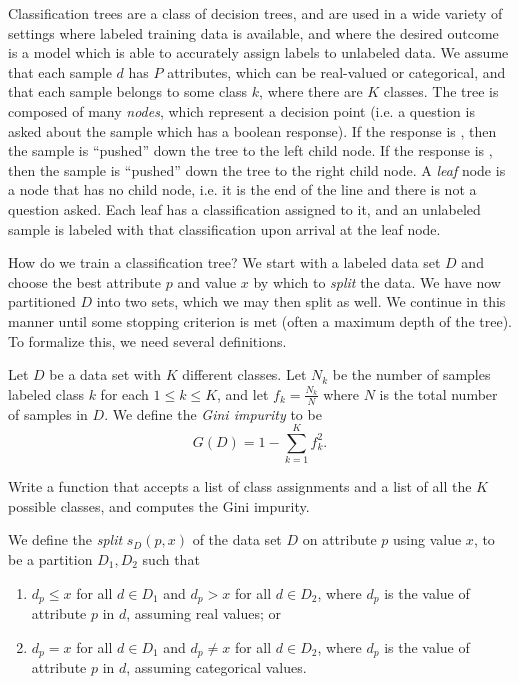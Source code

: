 
Classification trees are a class of decision trees, and are used in a wide variety of settings where labeled training data is available, and where the desired outcome is a model which is able to accurately assign labels to unlabeled data. We assume that each sample $d$ has $P$ attributes, which can be real-valued or categorical, and that each sample belongs to some class $k$, where there are $K$ classes. The tree is composed of many \emph{nodes}, which represent a decision point (i.e. a question is asked about the sample which has a boolean response). If the response is , then the sample is ``pushed'' down the tree to the left child node. If the response is , then the sample is ``pushed'' down the tree to the right child node. A \emph{leaf} node is a node that has no child node, i.e. it is the end of the line and there is not a question asked.  Each leaf has a classification assigned to it, and an unlabeled sample is labeled with that classification upon arrival at the leaf node.

How do we train a classification tree? We start with a labeled data set $D$ and choose the best attribute $p$ and value $x$ by which to \emph{split} the data. We have now partitioned $D$ into two sets, which we may then split as well. We continue in this manner until some stopping criterion is met (often a maximum depth of the tree). To formalize this, we need several definitions.

\begin{definition}
Let $D$ be a data set with $K$ different classes. Let $N_{k}$ be the number of samples labeled class $k$ for each $1 \leq k \leq K$, and let $f_{k} = \frac{N_{k}}{N}$ where $N$ is the total number of samples in $D$. We define the \emph{Gini impurity} to be 
\begin{equation*}
G(D) = 1 - \sum_{k=1}^{K} f_{k}^{2}.
\end{equation*}
\end{definition}

\begin{problem}
Write a function that accepts a list of class assignments and a list of all the $K$ possible classes, and computes the Gini impurity.
\end{problem}

\begin{definition}
We define the \emph{split} $s_{D}(p,x)$ of the data set $D$ on attribute $p$ using value $x$, to be a partition $D_{1},D_{2}$ such that 
\begin{enumerate}
	\item $d_{p} \leq x$ for all $d \in D_{1}$ and $d_{p} > x$ for all $d \in D_{2}$, where $d_{p}$ is the value of attribute $p$ in $d$, assuming real values; or \\
	\item $d_{p} = x$ for all $d \in D_{1}$ and $d_{p} \neq x$ for all $d \in D_{2}$, where $d_{p}$ is the value of attribute $p$ in $d$, assuming categorical values.
\end{enumerate}
\end{definition}

